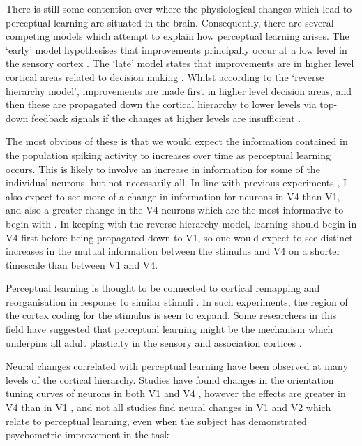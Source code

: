 There is still some contention over where the physiological changes which lead to perceptual learning are situated in the brain.
Consequently, there are several competing models which attempt to explain how perceptual learning arises.
The `early' model hypothesises that improvements principally occur at a low level in the sensory cortex \cite{Gilbert2001,Fahle2005}.
The `late' model states that improvements are in higher level cortical areas related to decision making \cite{Yu2004}.
Whilst according to the `reverse hierarchy model', improvements are made first in higher level decision areas, and then these are propagated down the cortical hierarchy to lower levels via top-down feedback signals if the changes at higher levels are insufficient \cite{Ahissar2004,Hochstein2002}.

The most obvious of these is that we would expect the information contained in the population spiking activity to increases over time as perceptual learning occurs.
This is likely to involve an increase in information for some of the individual neurons, but not necessarily all.
In line with previous experiments \cite{Raiguel2006}, I also expect to see more of a change in information for neurons in \ac{V4} than \ac{V1}, and also a greater change in the \ac{V4} neurons which are the most informative to begin with \cite{Raiguel2006}.
In keeping with the reverse hierarchy model, learning should begin in \ac{V4} first before being propagated down to \ac{V1}, so one would expect to see distinct increases in the mutual information between the stimulus and \ac{V4} on a shorter timescale than between \ac{V1} and \ac{V4}.

Perceptual learning is thought to be connected to cortical remapping and reorganisation in response to similar stimuli \cite{Dinse2003,Pleger2003,Polley2006}.
In such experiments, the region of the cortex coding for the stimulus is seen to expand.
Some researchers in this field have suggested that perceptual learning might be the mechanism which underpins all adult plasticity in the sensory and association cortices \cite{Gilbert2001}.


Neural changes correlated with perceptual learning have been observed at many levels of the cortical hierarchy.
Studies have found changes in the orientation tuning curves of neurons in both \ac{V1} \cite{Schoups2001} and \ac{V4} \cite{Yang2004,Raiguel2006}, however the effects are greater in \ac{V4} than in \ac{V1} \cite{Raiguel2006}, and not all studies find neural changes in \ac{V1} and \ac{V2} which relate to perceptual learning, even when the subject has demonstrated psychometric improvement in the task \cite{Ghose2002}.

